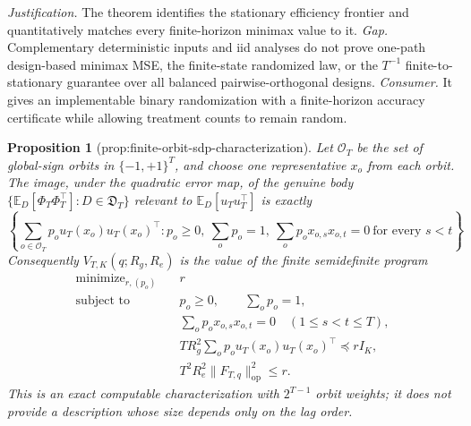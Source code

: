 \documentclass{article}
\newtheorem{proposition}{Proposition}
\begin{document}
\par\smallskip\noindent \textit{Justification.} The theorem identifies the stationary efficiency frontier and quantitatively matches every finite-horizon minimax value to it. \textit{Gap.} Complementary deterministic inputs and iid analyses do not prove one-path design-based minimax MSE, the finite-state randomized law, or the \(T^{-1}\) finite-to-stationary guarantee over all balanced pairwise-orthogonal designs. \textit{Consumer.} It gives an implementable binary randomization with a finite-horizon accuracy certificate while allowing treatment counts to remain random.

\begin{proposition}[prop:finite-orbit-sdp-characterization]\label{prop:finite-orbit-sdp-characterization}
Let \(\mathcal O_T\) be the set of global-sign orbits in \(\{-1,+1\}^T\), and choose one representative \(x_o\) from each orbit.  The image, under the quadratic error map, of the genuine body \(\{\mathbb E_D[\Phi_T\Phi_T^{\top}]:D\in\mathfrak D_T\}\) relevant to \(\mathbb E_D[u_Tu_T^{\top}]\) is exactly
\[
\left\{\sum_{o\in\mathcal O_T}p_o u_T(x_o)u_T(x_o)^{\top}:
p_o\ge0,\ \sum_op_o=1,\
\sum_op_o x_{o,s}x_{o,t}=0\ \text{for every }s<t\right\}. \tag{38}
\]
Consequently \(V_{T,K}(q;R_g,R_e)\) is the value of the finite semidefinite program
\[
\begin{aligned}
\operatorname{minimize}_{r,(p_o)}\quad&r\\
\text{subject to}\quad
&p_o\ge0,\qquad \sum_op_o=1,\\
&\sum_op_o x_{o,s}x_{o,t}=0\quad(1\le s<t\le T),\\
&TR_g^2\sum_op_o u_T(x_o)u_T(x_o)^{\top}\preceq rI_K,\\
&T^2R_e^2\|F_{T,q}\|_{\mathrm{op}}^2\le r.
\end{aligned} \tag{39}
\]
This is an exact computable characterization with \(2^{T-1}\) orbit weights; it does not provide a description whose size depends only on the lag order.
\end{proposition}
\end{document}
